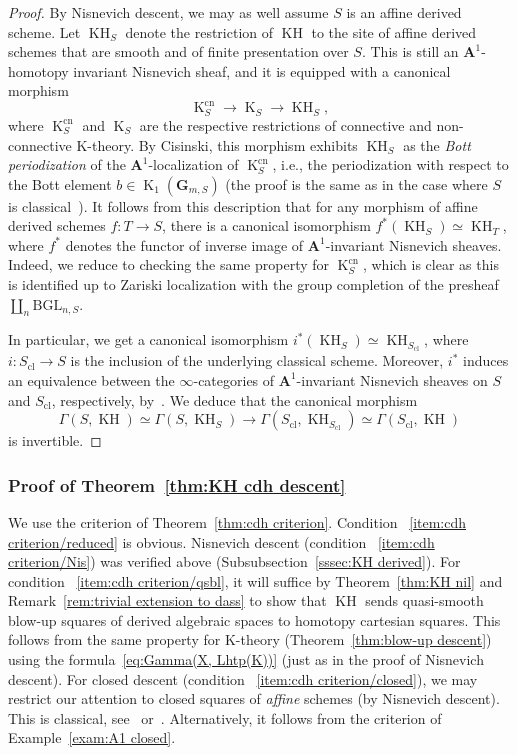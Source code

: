 \documentclass[11pt]{article}
\theoremstyle{definition}
\numberwithin{equation}{section}
\numberwithin{figure}{section}
\numberwithin{table}{section}
\newcommand{\bA}{\ensuremath{\mathbf{A}}\xspace}
\newcommand{\bG}{\ensuremath{\mathbf{G}}\xspace}
\newcommand{\A}{\bA}
\newcommand{\cl}{{\mrm{cl}}}
\DeclareMathOperator{\cn}{cn}
\DeclareMathOperator{\K}{K}
\DeclareMathOperator{\KH}{KH}
\newcommand{\mrm}[1]{\ensuremath{\mathrm{#1}}\xspace}
\newcommand*{\MK}{\mkern 2mu}
\begin{document}
\begin{proof}
By Nisnevich descent, we may as well assume $S$ is an affine derived scheme. Let $\KH_S$ denote the restriction of $\KH$ to the site of affine derived schemes that are smooth and of finite presentation over $S$. This is still an $\A^1$-homotopy invariant Nisnevich sheaf, and it is equipped with a canonical morphism
\[
\K^{\cn}_S \to \K_S \to \KH_S,
\]
where $\K^{\cn}_S$ and $\K_S$ are the respective restrictions of connective and non-connective K-theory. By Cisinski, this morphism exhibits $\KH_S$ as the \emph{Bott periodization} of the $\A^1$-localization of $\K^{\cn}_S$, i.e., the periodization with respect to the Bott element $b \in \K_1(\bG_{m,S})$ (the proof is the same as in the case where $S$ is classical~\cite[Corollary~2.12]{CisinskiKH}). It follows from this description that for any morphism of affine derived schemes $f : T \to S$, there is a canonical isomorphism $f^*(\KH_S) \simeq \KH_T$, where $f^*$ denotes the functor of inverse image of $\A^1$-invariant Nisnevich sheaves. Indeed, we reduce to checking the same property for $\K^{\cn}_S$, which is clear as this is identified up to Zariski localization with the group completion of the presheaf $\coprod_n \mrm{BGL}_{n,S}$.

In particular, we get a canonical isomorphism $i^*(\KH_S) \simeq \KH_{S_\cl}$, where $i : S_\cl \to S$ is the inclusion of the underlying classical scheme. Moreover, $i^*$ induces an equivalence between the $\infty$-categories of $\A^1$-invariant Nisnevich sheaves on $S$ and $S_\cl$, respectively, by~\cite[Corollary~1.3.5]{KhanThesis}. We deduce that the canonical morphism
\[
\Gamma(S, \KH)
\simeq \Gamma(S, \KH_S)
\to \Gamma(S_\cl, \KH_{S_\cl})
\simeq \Gamma(S_\cl, \KH)
\]
is invertible.
\end{proof}

\subsubsection{Proof of Theorem~\ref{thm:KH cdh descent}}\label{sssec:proof of KH cdh descent}

We use the criterion of Theorem~\ref{thm:cdh criterion}. Condition~
\eqref{item:cdh criterion/reduced} is obvious. Nisnevich descent (condition~
\eqref{item:cdh criterion/Nis}) was verified above (Subsubsection~\ref{sssec:KH derived}). For condition~
\eqref{item:cdh criterion/qsbl}, it will suffice by Theorem~\ref{thm:KH nil} and Remark~\ref{rem:trivial extension to dass} to show that $\KH$ sends quasi-smooth blow-up squares of derived algebraic spaces to homotopy cartesian squares. This follows from the same property for K-theory (Theorem~\ref{thm:blow-up descent}) using the formula~\eqref{eq:Gamma(X, Lhtp(K))} (just as in the proof of Nisnevich descent). For closed descent (condition~
\eqref{item:cdh criterion/closed}), we may restrict our attention to closed squares of \emph{affine} schemes (by Nisnevich descent). This is classical, see~\cite[Exer.~9.11$\MK$(f)]{ThomasonTrobaugh} or~\cite[Corollary~4.10]{WeibelKH}. Alternatively, it follows from the criterion of Example~\ref{exam:A1 closed}.
\end{document}
